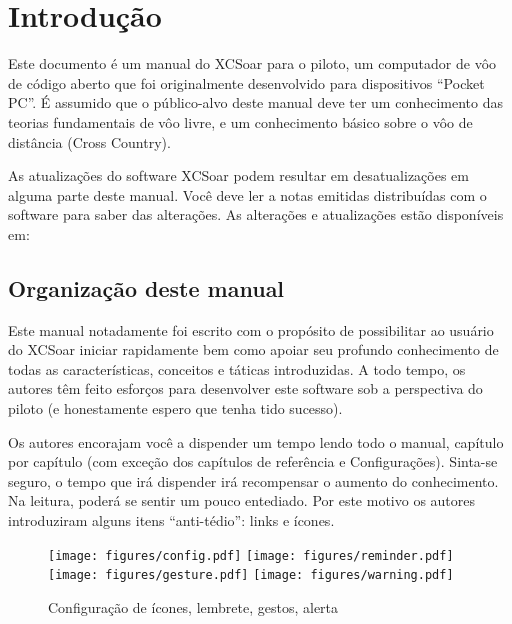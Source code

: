 \chapter{Introdução}\label{cha:introduction}
Este documento é um manual do XCSoar para o piloto, um computador de vôo de código aberto que foi originalmente desenvolvido para dispositivos “Pocket PC”.  É assumido que o público-alvo deste manual deve ter um conhecimento das teorias fundamentais de vôo livre, e um conhecimento básico sobre o vôo de distância (Cross Country).

As atualizações do software XCSoar podem resultar em desatualizações em alguma parte deste manual.   Você deve ler a notas emitidas distribuídas com o software para saber das alterações.  As alterações e atualizações estão disponíveis em:  
\begin{quote}
\xcsoarwebsite{}
\end{quote}

\section{Organização deste manual}

Este manual notadamente foi escrito com o propósito de possibilitar ao usuário do XCSoar iniciar rapidamente bem como apoiar seu profundo conhecimento de todas as características, conceitos e táticas introduzidas.  A todo tempo, os autores têm feito esforços para desenvolver este software sob a perspectiva do piloto (e honestamente espero que tenha tido sucesso).

Os autores encorajam você a dispender um tempo lendo todo o manual, capítulo por capítulo (com exceção dos capítulos de referência e Configurações).  Sinta-se seguro, o tempo que irá dispender irá recompensar o aumento do conhecimento.  Na leitura, poderá se sentir um pouco entediado.  Por este motivo os autores introduziram alguns itens “anti-tédio”: links e ícones.

\begin{figure}[h]
\centering
\texttt{[image: figures/config.pdf]}
\hspace{1.5cm}
\texttt{[image: figures/reminder.pdf]}
\hspace{1.5cm}
\texttt{[image: figures/gesture.pdf]}
\hspace{1.5cm}
\texttt{[image: figures/warning.pdf]}
\caption{Configuração de ícones, lembrete, gestos, alerta}
\end{figure}

